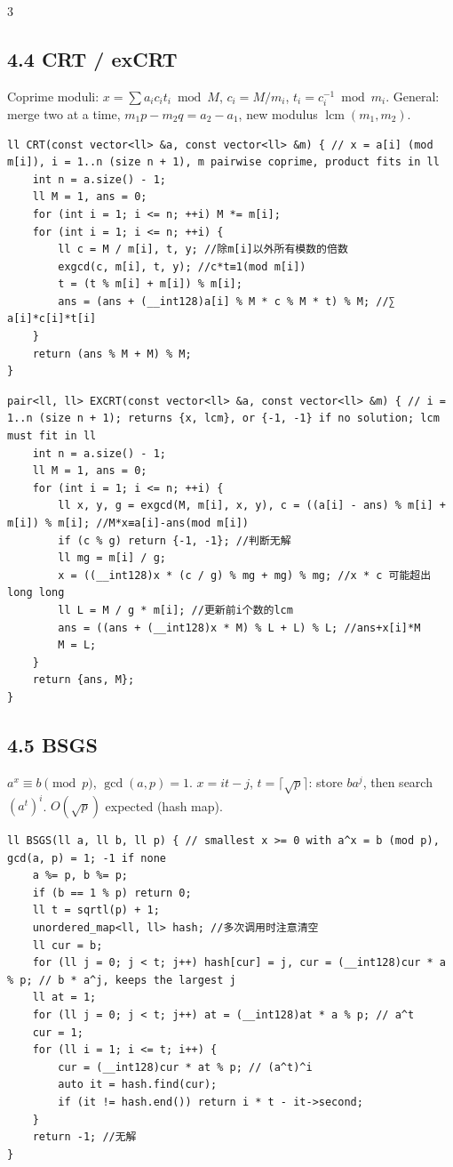 \documentclass[8pt]{extarticle}
\begin{document}
\begin{multicols*}{3}
\subsection*{4.4 CRT / exCRT}

Coprime moduli: $x = \sum a_i c_i t_i \bmod M$, $c_i = M / m_i$, $t_i = c_i^{-1} \bmod m_i$. General: merge two at a time, $m_1 p - m_2 q = a_2 - a_1$, new modulus $\operatorname{lcm}(m_1, m_2)$.

\begin{lstlisting}
ll CRT(const vector<ll> &a, const vector<ll> &m) { // x = a[i] (mod m[i]), i = 1..n (size n + 1), m pairwise coprime, product fits in ll
    int n = a.size() - 1;
    ll M = 1, ans = 0;
    for (int i = 1; i <= n; ++i) M *= m[i];
    for (int i = 1; i <= n; ++i) {
        ll c = M / m[i], t, y; //除m[i]以外所有模数的倍数
        exgcd(c, m[i], t, y); //c*t≡1(mod m[i])
        t = (t % m[i] + m[i]) % m[i];
        ans = (ans + (__int128)a[i] % M * c % M * t) % M; //∑ a[i]*c[i]*t[i]
    }
    return (ans % M + M) % M;
}
\end{lstlisting}

\begin{lstlisting}
pair<ll, ll> EXCRT(const vector<ll> &a, const vector<ll> &m) { // i = 1..n (size n + 1); returns {x, lcm}, or {-1, -1} if no solution; lcm must fit in ll
    int n = a.size() - 1;
    ll M = 1, ans = 0;
    for (int i = 1; i <= n; ++i) {
        ll x, y, g = exgcd(M, m[i], x, y), c = ((a[i] - ans) % m[i] + m[i]) % m[i]; //M*x≡a[i]-ans(mod m[i])
        if (c % g) return {-1, -1}; //判断无解
        ll mg = m[i] / g;
        x = ((__int128)x * (c / g) % mg + mg) % mg; //x * c 可能超出 long long
        ll L = M / g * m[i]; //更新前i个数的lcm
        ans = ((ans + (__int128)x * M) % L + L) % L; //ans+x[i]*M
        M = L;
    }
    return {ans, M};
}
\end{lstlisting}

\subsection*{4.5 BSGS}

$a^x \equiv b \pmod p$, $\gcd(a, p) = 1$. $x = it - j$, $t = \lceil \sqrt p \rceil$: store $b a^j$, then search $(a^t)^i$. $O(\sqrt p)$ expected (hash map).

\begin{lstlisting}
ll BSGS(ll a, ll b, ll p) { // smallest x >= 0 with a^x = b (mod p), gcd(a, p) = 1; -1 if none
    a %= p, b %= p;
    if (b == 1 % p) return 0;
    ll t = sqrtl(p) + 1;
    unordered_map<ll, ll> hash; //多次调用时注意清空
    ll cur = b;
    for (ll j = 0; j < t; j++) hash[cur] = j, cur = (__int128)cur * a % p; // b * a^j, keeps the largest j
    ll at = 1;
    for (ll j = 0; j < t; j++) at = (__int128)at * a % p; // a^t
    cur = 1;
    for (ll i = 1; i <= t; i++) {
        cur = (__int128)cur * at % p; // (a^t)^i
        auto it = hash.find(cur);
        if (it != hash.end()) return i * t - it->second;
    }
    return -1; //无解
}
\end{lstlisting}


\end{multicols*}
\end{document}
